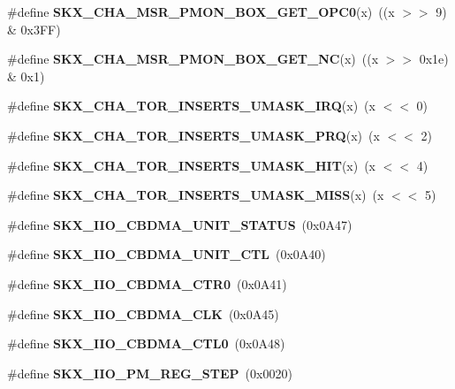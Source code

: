 \begin{DoxyCompactItemize}
\mbox{\label{types_8h_a5687a47e982820cda8547bc1d3f3fb82}} 
\#define {\bfseries S\+K\+X\+\_\+\+C\+H\+A\+\_\+\+M\+S\+R\+\_\+\+P\+M\+O\+N\+\_\+\+B\+O\+X\+\_\+\+G\+E\+T\+\_\+\+O\+P\+C0}(x)~((x $>$$>$ 9) \& 0x3\+F\+F)
\item 
\mbox{\label{types_8h_acc13a23a092d5d82d744ef4a3ac2506a}} 
\#define {\bfseries S\+K\+X\+\_\+\+C\+H\+A\+\_\+\+M\+S\+R\+\_\+\+P\+M\+O\+N\+\_\+\+B\+O\+X\+\_\+\+G\+E\+T\+\_\+\+NC}(x)~((x $>$$>$ 0x1e) \& 0x1)
\item 
\mbox{\label{types_8h_add257cb66c7ffef2e4753ca1f32c1a0a}} 
\#define {\bfseries S\+K\+X\+\_\+\+C\+H\+A\+\_\+\+T\+O\+R\+\_\+\+I\+N\+S\+E\+R\+T\+S\+\_\+\+U\+M\+A\+S\+K\+\_\+\+I\+RQ}(x)~(x $<$$<$ 0)
\item 
\mbox{\label{types_8h_a2d21c2dbeb7d1ff55428c792d38266d3}} 
\#define {\bfseries S\+K\+X\+\_\+\+C\+H\+A\+\_\+\+T\+O\+R\+\_\+\+I\+N\+S\+E\+R\+T\+S\+\_\+\+U\+M\+A\+S\+K\+\_\+\+P\+RQ}(x)~(x $<$$<$ 2)
\item 
\mbox{\label{types_8h_a7d39d605bf3a0984ccfa2bc8077fdd3e}} 
\#define {\bfseries S\+K\+X\+\_\+\+C\+H\+A\+\_\+\+T\+O\+R\+\_\+\+I\+N\+S\+E\+R\+T\+S\+\_\+\+U\+M\+A\+S\+K\+\_\+\+H\+IT}(x)~(x $<$$<$ 4)
\item 
\mbox{\label{types_8h_a98f3a280dfbf8eb719dfa66ce28a4acd}} 
\#define {\bfseries S\+K\+X\+\_\+\+C\+H\+A\+\_\+\+T\+O\+R\+\_\+\+I\+N\+S\+E\+R\+T\+S\+\_\+\+U\+M\+A\+S\+K\+\_\+\+M\+I\+SS}(x)~(x $<$$<$ 5)
\item 
\mbox{\label{types_8h_ac52e63bc5119f22a0ea2dc8e150091cb}} 
\#define {\bfseries S\+K\+X\+\_\+\+I\+I\+O\+\_\+\+C\+B\+D\+M\+A\+\_\+\+U\+N\+I\+T\+\_\+\+S\+T\+A\+T\+US}~(0x0\+A47)
\item 
\mbox{\label{types_8h_aacb02845fe5896e30accbe2c8cb1d611}} 
\#define {\bfseries S\+K\+X\+\_\+\+I\+I\+O\+\_\+\+C\+B\+D\+M\+A\+\_\+\+U\+N\+I\+T\+\_\+\+C\+TL}~(0x0\+A40)
\item 
\mbox{\label{types_8h_a6374d13f3e8af31d53d7ba26ca5cb643}} 
\#define {\bfseries S\+K\+X\+\_\+\+I\+I\+O\+\_\+\+C\+B\+D\+M\+A\+\_\+\+C\+T\+R0}~(0x0\+A41)
\item 
\mbox{\label{types_8h_a895005676b4b70f1ba48b80152657242}} 
\#define {\bfseries S\+K\+X\+\_\+\+I\+I\+O\+\_\+\+C\+B\+D\+M\+A\+\_\+\+C\+LK}~(0x0\+A45)
\item 
\mbox{\label{types_8h_a41d74675b6cc80d8c5bd457421fa2272}} 
\#define {\bfseries S\+K\+X\+\_\+\+I\+I\+O\+\_\+\+C\+B\+D\+M\+A\+\_\+\+C\+T\+L0}~(0x0\+A48)
\item 
\mbox{\label{types_8h_ae9e0919fa4e72794d33d145aa104f4b8}} 
\#define {\bfseries S\+K\+X\+\_\+\+I\+I\+O\+\_\+\+P\+M\+\_\+\+R\+E\+G\+\_\+\+S\+T\+EP}~(0x0020)

\end{DoxyCompactItemize}
